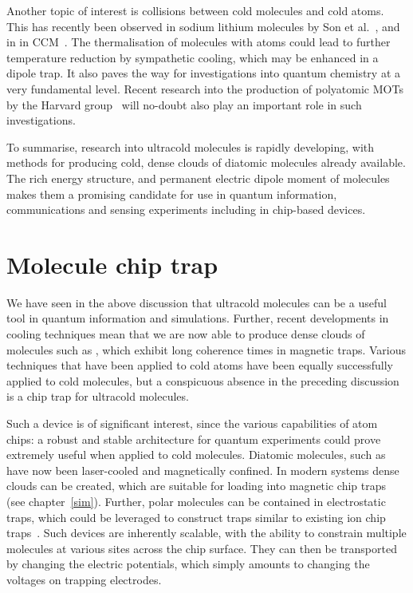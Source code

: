 Another topic of interest is collisions between cold molecules and cold atoms.
This has recently been observed in sodium lithium molecules by Son et
al.~\cite{son2019collisional}, and in \CaF{} in CCM~\cite{Jurgilas2021,
JurgilasPRL_2021}. The thermalisation of molecules with atoms could lead to
further temperature reduction by sympathetic cooling, which may be enhanced in
a dipole trap. It also paves the way for investigations into quantum chemistry
at a very fundamental level. Recent research into the production of polyatomic
MOTs by the Harvard group~\cite{DoylePolyatomic2022} will no-doubt also play an
important role in such investigations.

To summarise, research into ultracold molecules is rapidly developing, with
methods for producing cold, dense clouds of diatomic molecules already
available. The rich energy structure, and permanent electric dipole moment of
molecules makes them a promising candidate for use in quantum information,
communications and sensing experiments including in chip-based devices.

\section{Molecule chip trap}

We have seen in the above discussion that ultracold molecules can be a useful
tool in quantum information and simulations. Further, recent developments in
cooling techniques mean that we are now able to produce dense clouds of
molecules such as \CaF{}, which exhibit long coherence times in magnetic traps.
Various techniques that have been applied to cold atoms have been equally
successfully applied to cold molecules, but a conspicuous absence in the
preceding discussion is a chip trap for ultracold molecules.

Such a device is of significant interest, since the various capabilities of
atom chips: a robust and stable architecture for quantum experiments could
prove extremely useful when applied to cold molecules. Diatomic molecules, such
as \CaF{} have now been laser-cooled and magnetically confined. In modern
systems dense clouds can be created, which are suitable for loading into
magnetic chip traps (see chapter~\ref{sim}). Further, polar molecules can be
contained in electrostatic traps, which could be leveraged to construct traps
similar to existing ion chip traps~\cite{Andre2006, Romaszko2020}. Such devices
are inherently scalable, with the ability to constrain multiple molecules at
various sites across the chip surface. They can then be transported by changing
the electric potentials, which simply amounts to changing the voltages on
trapping electrodes.


